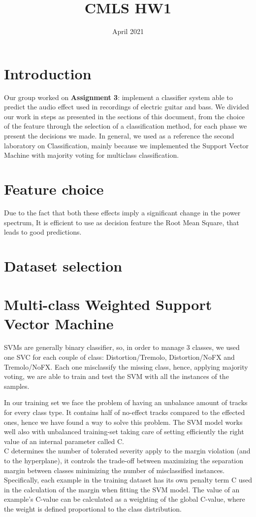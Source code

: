 \documentclass{article}
\title{CMLS HW1}
\author{}
\date{April 2021}
\begin{document}
\maketitle
\section{Introduction}
Our group worked on \textbf{Assignment 3}: implement a classifier system able to predict the audio effect used in recordings of electric guitar and bass. We divided our work in steps as presented in the sections of this document, from the choice of the feature through the selection of a classification method, for each phase we present the decisions we made. In general, we used as a reference the second laboratory on Classification, mainly because we implemented the Support Vector Machine with majority voting for multiclass classification.
\section{Feature choice}
Due to the fact that both these effects imply a significant change in the power spectrum, It is efficient to use  as decision feature the Root Mean Square, that leads to good predictions.
\section{Dataset selection}
\section{Multi-class Weighted Support Vector Machine}
SVMs are generally binary classifier, so, in order to manage 3 classes, we used one SVC for each couple of class: Distortion/Tremolo, Distortion/NoFX and Tremolo/NoFX. Each one misclassify the missing class, hence, applying majority voting, we are able to train and test the SVM with all the instances of the samples.

In our training set we face the problem of having an unbalance amount of tracks for every class type. It contains half of no-effect tracks compared to the effected ones, hence we have found a way to solve this problem. The SVM model works well also with unbalanced training-set taking care of setting efficiently the right value of an internal parameter called C.\\ C  determines the number of tolerated severity apply to the margin violation (and to the hyperplane), it controls the trade-off between maximizing the separation margin between classes minimizing the number of misclassified instances.
Specifically, each example in the training dataset has its own penalty term C used in the calculation of the margin when fitting the SVM model. The value of an example’s C-value can be calculated as a weighting of the global C-value, where the weight is defined proportional to the class distribution. 
\end{document}
